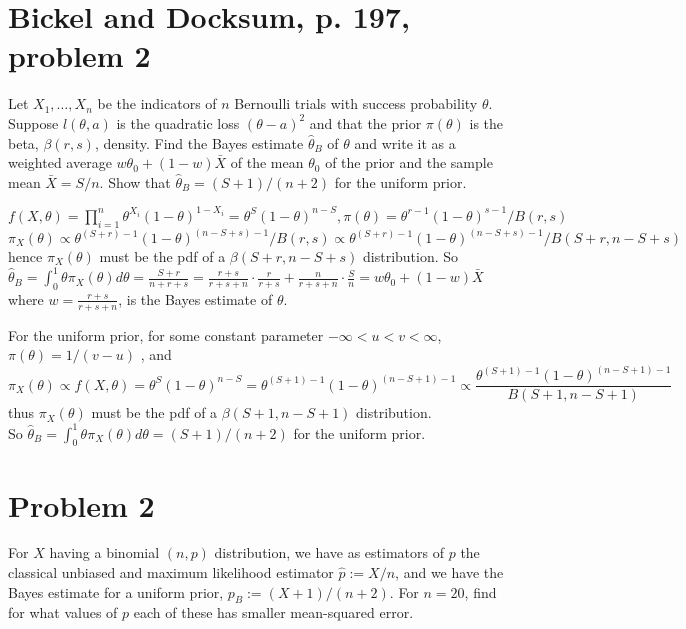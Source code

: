 \def\thecourse{18.466}
\def\thestudent{Zhilei Xu (929552018)}
\def\theprob{4}


\section{Bickel and Docksum, p. 197, problem 2}
\ProbS
Let $X_1, \dots, X_n$ be the indicators of $n$ Bernoulli trials with success probability $\theta$. Suppose $l(\theta, a)$ is the quadratic loss $(\theta-a)^2$ and that the prior $\pi(\theta)$ is the beta,
$\beta(r, s)$, density. Find the Bayes estimate $\hat{\theta}_B$ of
$\theta$ and write it as a weighted average $w\theta_0 + (1-w)\bar{X}$ of the mean $\theta_0$ of the prior and the sample mean $\bar{X} = S/n$. Show that $\hat{\theta}_B = (S+1)/(n+2)$ for the uniform prior.
\ProbE

$
f(X, \theta) = \prod_{i=1}^{n} \theta^{X_i} (1-\theta)^{1-X_i}
= \theta^{S} (1-\theta)^{n-S},
\pi(\theta) = \theta^{r-1} (1-\theta)^{s-1} / B(r,s)
$
\\
$
\pi_X(\theta) \propto
{\theta^{(S+r)-1}(1-\theta)^{(n-S+s)-1}} / {B(r, s)} \propto
{\theta^{(S+r)-1}(1-\theta)^{(n-S+s)-1}} / {B(S+r, n-S+s)}
$
\\
hence $\pi_X(\theta)$ must be the pdf of a
$\beta(S+r, n-S+s)$ distribution. So
$
\hat{\theta}_B =
\int_{0}^{1} \theta \pi_X(\theta) d\theta
= \frac{S+r}{n+r+s}
= \frac{r+s}{r+s+n} \cdot \frac{r}{r+s} +
  \frac{n}{r+s+n} \cdot \frac{S}{n}
= w \theta_0 + (1-w) \bar{X}
$
\\
where $w = \frac{r+s}{r+s+n}$,
is the Bayes estimate of $\theta$.

For the uniform prior, for some constant parameter
$-\infty < u<v < \infty$,
$
\pi(\theta) = 1/(v-u)
$
, and
$$
\pi_X(\theta) \propto
f(X, \theta) =
\theta^{S} (1-\theta)^{n-S}
=
\theta^{(S+1)-1} (1-\theta)^{(n-S+1)-1} \propto
\frac{\theta^{(S+1)-1} (1-\theta)^{(n-S+1)-1}}{B(S+1, n-S+1)}
$$
thus $\pi_X(\theta)$ must be the pdf of a
$\beta(S+1, n-S+1)$ distribution.\\
So
$
\hat{\theta}_B =
\int_{0}^{1} \theta \pi_X(\theta) d\theta
= (S+1)/(n+2)
$
for the uniform prior.

\section{Problem 2}
\ProbS
For $X$ having a binomial $(n,p)$ distribution, we have as estimators of $p$ the classical unbiased and maximum likelihood estimator
$
\hat{p} := X/n
$, and we have the Bayes estimate for a uniform prior,
$
p_B := (X+1)/(n+2)
$. For $n=20$, find for what values of $p$ each of these has smaller mean-squared error.
\ProbE

